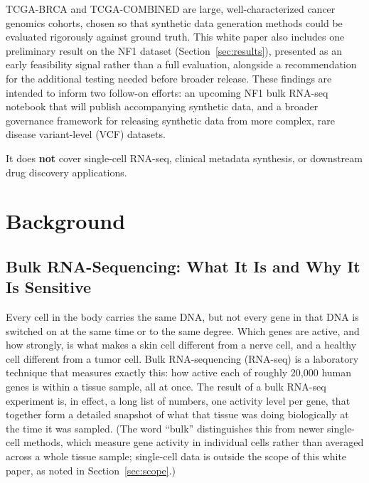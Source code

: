 \documentclass[webpdf,contemporary,large]{oup-authoring-template}%
\theoremstyle{thmstyleone}%
\theoremstyle{thmstyletwo}%
\theoremstyle{thmstylethree}%
\begin{document}
TCGA-BRCA and TCGA-COMBINED are large, well-characterized cancer genomics cohorts, chosen so that synthetic data generation methods could be evaluated rigorously against ground truth. This white paper also includes one preliminary result on the NF1 dataset (Section~\ref{sec:results}), presented as an early feasibility signal rather than a full evaluation, alongside a recommendation for the additional testing needed before broader release. These findings are intended to inform two follow-on efforts: an upcoming NF1 bulk RNA-seq notebook that will publish accompanying synthetic data, and a broader governance framework for releasing synthetic data from more complex, rare disease variant-level (VCF) datasets.

It does \textbf{not} cover single-cell RNA-seq, clinical metadata synthesis, or downstream drug discovery applications.

\section{Background}

\subsection{Bulk RNA-Sequencing: What It Is and Why It Is Sensitive}

Every cell in the body carries the same DNA, but not every gene in that DNA is switched on at the same time or to the same degree. Which genes are active, and how strongly, is what makes a skin cell different from a nerve cell, and a healthy cell different from a tumor cell. Bulk RNA-sequencing (RNA-seq) is a laboratory technique that measures exactly this: how active each of roughly 20{,}000 human genes is within a tissue sample, all at once. The result of a bulk RNA-seq experiment is, in effect, a long list of numbers, one activity level per gene, that together form a detailed snapshot of what that tissue was doing biologically at the time it was sampled. (The word ``bulk'' distinguishes this from newer single-cell methods, which measure gene activity in individual cells rather than averaged across a whole tissue sample; single-cell data is outside the scope of this white paper, as noted in Section~\ref{sec:scope}.)
\end{document}

